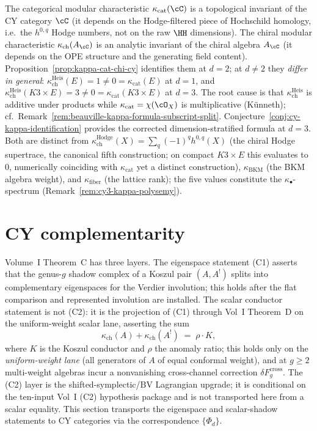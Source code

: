 \begin{remark}
\label{rem:kappa-cat-vs-kappa-ch}
The categorical modular characteristic $\kappa_{\mathrm{cat}}(\cC)$ is a topological invariant of the CY category $\cC$ (it depends on the Hodge-filtered piece of Hochschild homology, i.e.\ the $h^{0,q}$ Hodge numbers, not on the raw $\HH$ dimensions). The chiral modular characteristic $\kappa_{\mathrm{ch}}(A_\cC)$ is an analytic invariant of the chiral algebra $A_\cC$ (it depends on the OPE structure and the generating field content). Proposition~\ref{prop:kappa-cat-chi-cy} identifies them at $d = 2$; at $d \neq 2$ they \emph{differ in general}: $\kappa_{\mathrm{ch}}^{\mathrm{Heis}}(E) = 1 \neq 0 = \kappa_{\mathrm{cat}}(E)$ at $d = 1$, and $\kappa_{\mathrm{ch}}^{\mathrm{Heis}}(K3 \times E) = 3 \neq 0 = \kappa_{\mathrm{cat}}(K3 \times E)$ at $d = 3$. The root cause is that $\kappa_{\mathrm{ch}}^{\mathrm{Heis}}$ is additive under products while $\kappa_{\mathrm{cat}} = \chi(\cO_X)$ is multiplicative (K\"unneth); cf.\ Remark~\ref{rem:beauville-kappa-formula-subscript-split}. Conjecture~\ref{conj:cy-kappa-identification} provides the corrected dimension-stratified formula at $d = 3$. Both are distinct from $\kappa_{\mathrm{ch}}^{\mathrm{Hodge}}(X) = \sum_q (-1)^q h^{0,q}(X)$ (the chiral Hodge supertrace, the canonical fifth construction; on compact $K3 \times E$ this evaluates to $0$, numerically coinciding with $\kappa_{\mathrm{cat}}$ yet a distinct construction), $\kappa_{\mathrm{BKM}}$ (the BKM algebra weight), and $\kappa_{\mathrm{fiber}}$ (the lattice rank); the five values constitute the $\kappa_\bullet$-spectrum (Remark~\ref{rem:cy3-kappa-polysemy}).
\end{remark}



\section{CY complementarity}
\label{sec:cy-complementarity-bridge}

Volume~I Theorem~C has three layers. The eigenspace statement (C1) asserts that the genus-$g$ shadow complex of a Koszul pair $(A, A^!)$ splits into complementary eigenspaces for the Verdier involution; this holds after the flat comparison and represented involution are installed. The scalar conductor statement is not (C2): it is the projection of (C1) through Vol~I Theorem~D on the uniform-weight scalar lane, asserting the sum
\[
 \kappa_{\mathrm{ch}}(A) + \kappa_{\mathrm{ch}}(A^!) \;=\; \rho \cdot K,
\]
where $K$ is the Koszul conductor and $\rho$ the anomaly ratio; this holds only on the \emph{uniform-weight lane} (all generators of $A$ of equal conformal weight), and at $g \geq 2$ multi-weight algebras incur a nonvanishing cross-channel correction $\delta F_g^{\mathrm{cross}}$. The (C2) layer is the shifted-symplectic/BV Lagrangian upgrade; it is conditional on the ten-input Vol~I (C2) hypothesis package and is not transported here from a scalar equality. This section transports the eigenspace and scalar-shadow statements to CY categories via the correspondence $\{\Phi_d\}$.

